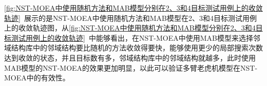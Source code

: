 \par
\autoref{fig:NST-MOEA中使用随机方法和MAB模型分别在2、3和4目标测试用例上的收敛轨迹}~展示的是NST-MOEA中使用随机方法和MAB模型在2、3和4目标测试用例上的收敛轨迹图，从\autoref{fig:NST-MOEA中使用随机方法和MAB模型分别在2、3和4目标测试用例上的收敛轨迹}~中能够看出，在NST-MOEA中使用MAB模型来选择邻域结构库中的邻域结构要比随机的方法收敛得要快，能够使用更少的局部搜索次数达到收敛的状态，并且目标数有多，邻域结构库中的邻域结构就越多，此时使用MAB模型的NST-MOEA的效果更加明显，以此可以验证多臂老虎机模型在NST-MOEA中的有效性。



